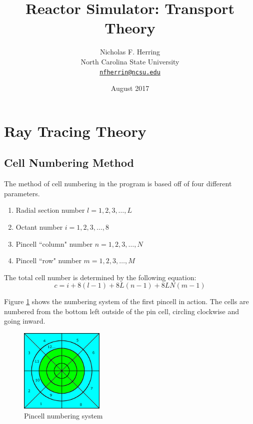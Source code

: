 \documentclass{article}
\begin{document}
\title{Reactor Simulator: Transport Theory}

\author{Nicholas F. Herring\\
North Carolina State University\\
\href{mailto: nfherrin@ncsu.edu}{\texttt{nfherrin@ncsu.edu}}
}

\date{August 2017}

\maketitle

\section{Ray Tracing Theory}
\subsection{Cell Numbering Method}

The method of cell numbering in the program is based off of four different parameters.

\begin{enumerate}
\item Radial section number $l=1, 2, 3, \dots, L$
\item Octant number $i=1, 2, 3, \dots, 8$
\item Pincell ``column" number $n=1, 2, 3, \dots, N$
\item Pincell ``row" number $m=1, 2, 3, \dots, M$
\end{enumerate}

The total cell number is determined by the following equation:
\begin{equation}
 c=i+8(l-1)+8 L(n-1)+8 LN(m-1)
 \label{eq:cellnumber}
\end{equation}

Figure \ref{fig:pincell} shows the numbering system of the first pincell in action. 
The cells are numbered from the bottom left outside of the pin cell, circling clockwise and going inward.

\begin{figure}[H]
\begin{center}
\includegraphics[width=40mm]{pincell.png}
\end{center}
\caption{Pincell numbering system}
\label{fig:pincell}
\end{figure}
\end{document}
